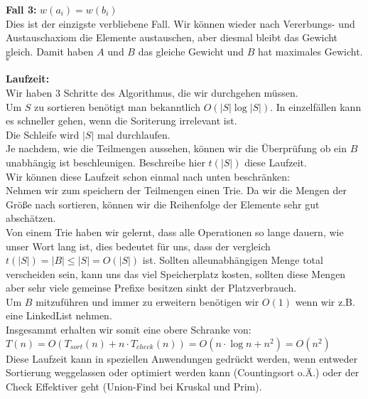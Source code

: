 \documentclass[11pt,a4paper,ngerman]{article}
\begin{document}
\begin{enumerate}[\bfseries (a)]
\textbf{Fall 3:} $w(a_i) = w(b_i)$\\
Dies ist der einzigste verbliebene Fall. Wir können wieder nach Vererbungs- und Austauschaxiom die Elemente austauschen, aber diesmal bleibt das Gewicht gleich. Damit haben $A$ und $B$ das gleiche Gewicht und $B$ hat maximales Gewicht.\\
\mbox{} \hfill $\square$

\textbf{Laufzeit:}\\

Wir haben 3 Schritte des Algorithmus, die wir durchgehen müssen.\\

Um $S$ zu sortieren benötigt man bekanntlich $O ( |S| \log |S|) $. In einzelfällen kann es schneller gehen, wenn die Soriterung irrelevant ist.\\

Die Schleife wird $|S|$ mal durchlaufen.\\
Je nachdem, wie die Teilmengen aussehen, können wir die Überprüfung ob ein $B$ unabhängig ist beschleunigen. Beschreibe hier $t(|S|)$ diese Laufzeit.\\
Wir können diese Laufzeit schon einmal nach unten beschränken:\\

Nehmen wir zum speichern der Teilmengen einen Trie. Da wir die Mengen der Größe nach sortieren, können wir die Reihenfolge der Elemente sehr gut abschätzen.\\
Von einem Trie haben wir gelernt, dass alle Operationen so lange dauern, wie unser Wort lang ist, dies bedeutet für uns, dass der vergleich $t(|S|) = |B| \leq |S| = O (|S| )$ ist. Sollten alleunabhängigen Menge total verscheiden sein, kann uns das viel Speicherplatz kosten, sollten diese Mengen aber sehr viele gemeinse Prefixe besitzen sinkt der Platzverbrauch.\\

Um $B$ mitzuführen und immer zu erweitern benötigen wir $O(1)$ wenn wir z.B. eine LinkedList nehmen.\\

Insgesammt erhalten wir somit eine obere Schranke von:\\
$T(n) = O( T_{sort}(n) + n \cdot T_{check} (n) ) = O(n \cdot \log n + n^2) = O(n^2)$\\

Diese Laufzeit kann in speziellen Anwendungen gedrückt werden, wenn entweder Sortierung weggelassen oder optimiert werden kann (Countingsort o.Ä.) oder der Check Effektiver geht (Union-Find bei Kruskal und Prim). 
\end{enumerate}

\label{LastPage}
\end{document}
